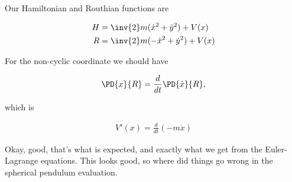 Our Hamiltonian and Routhian functions are

\begin{align}\label{eqn:goldsteinRouth:21}
H &= \inv{2} m (\dot{x}^2 + \dot{y}^2 ) + V(x) \\
R &= \inv{2} m (-\dot{x}^2 + \dot{y}^2 ) + V(x) 
\end{align}

For the non-cyclic coordinate we should have

\begin{align}\label{eqn:goldsteinRouth:22}
\PD{x}{R} = \frac{d}{dt} \PD{\dot{x}}{R},
\end{align}

which is

\begin{align}\label{eqn:goldsteinRouth:23}
V'(x) = \frac{d}{dt}\left( - m \dot{x} \right)
\end{align}

Okay, good, that's what is expected, and exactly what we get from the Euler-Lagrange equations.  This looks good, so where did things go wrong in the spherical pendulum evaluation.

\EndArticle
